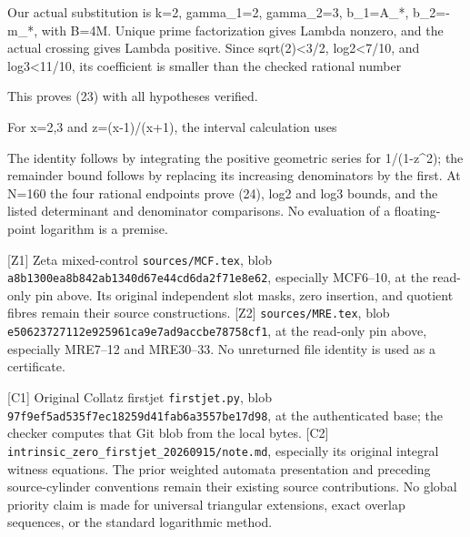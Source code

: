 
Our actual substitution is k=2, gamma\_1=2, gamma\_2=3, b\_1=A\_*,
b\_2=-m\_*, with B=4M. Unique prime factorization gives Lambda nonzero,
and the actual crossing gives Lambda positive. Since
sqrt(2)\textless3/2, log2\textless7/10, and log3\textless11/10, its
coefficient is smaller than the checked rational number


This proves (23) with all hypotheses verified.

For x=2,3 and z=(x-1)/(x+1), the interval calculation uses


The identity follows by integrating the positive geometric series for
1/(1-z\^{}2); the remainder bound follows by replacing its increasing
denominators by the first. At N=160 the four rational endpoints prove
(24), log2 and log3 bounds, and the listed determinant and denominator
comparisons. No evaluation of a floating-point logarithm is a premise.

{[}Z1{]} Zeta mixed-control \nolinkurl{sources/MCF.tex}, blob
\nolinkurl{a8b1300ea8b842ab1340d67e44cd6da2f71e8e62}, especially
MCF6--10, at the read-only pin above. Its original independent slot
masks, zero insertion, and quotient fibres remain their source
constructions. {[}Z2{]} \nolinkurl{sources/MRE.tex}, blob
\nolinkurl{e50623727112e925961ca9e7ad9accbe78758cf1}, at the read-only
pin above, especially MRE7--12 and MRE30--33. No unreturned file
identity is used as a certificate.

{[}C1{]} Original Collatz firstjet \nolinkurl{firstjet.py}, blob
\nolinkurl{97f9ef5ad535f7ec18259d41fab6a3557be17d98}, at the
authenticated base; the checker computes that Git blob from the local
bytes. {[}C2{]} \nolinkurl{intrinsic_zero_firstjet_20260915/note.md},
especially its original integral witness equations. The prior weighted
automata presentation and preceding source-cylinder conventions remain
their existing source contributions. No global priority claim is made
for universal triangular extensions, exact overlap sequences, or the
standard logarithmic method.
